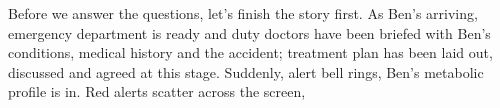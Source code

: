 Before we answer the questions, let's finish the story first. As Ben's arriving, emergency department is ready and duty doctors have been briefed with Ben's conditions, medical history and the accident; treatment plan has been laid out, discussed and agreed at this stage. Suddenly, alert bell rings, Ben's metabolic profile is in. Red alerts scatter across the screen, 